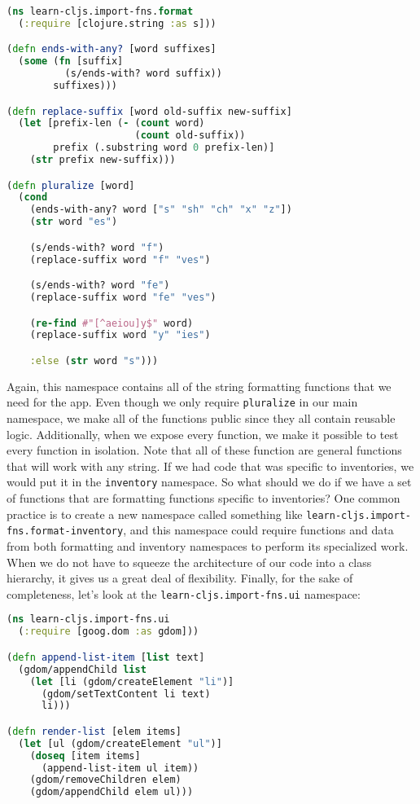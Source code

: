 \documentclass[10pt,twoside,openright]{memoir}
\begin{document}
\begin{lstlisting}[language=Clojure, caption={learn\_cljs/import\_fns/format.cljs}]
(ns learn-cljs.import-fns.format
  (:require [clojure.string :as s]))

(defn ends-with-any? [word suffixes]
  (some (fn [suffix]
          (s/ends-with? word suffix))
        suffixes)))

(defn replace-suffix [word old-suffix new-suffix]
  (let [prefix-len (- (count word)
                      (count old-suffix))
        prefix (.substring word 0 prefix-len)]
    (str prefix new-suffix)))

(defn pluralize [word]
  (cond
    (ends-with-any? word ["s" "sh" "ch" "x" "z"])
    (str word "es")

    (s/ends-with? word "f")
    (replace-suffix word "f" "ves")

    (s/ends-with? word "fe")
    (replace-suffix word "fe" "ves")

    (re-find #"[^aeiou]y$" word)
    (replace-suffix word "y" "ies")

    :else (str word "s")))
\end{lstlisting}

Again, this namespace contains all of the string formatting functions
that we need for the app. Even though we only require \texttt{pluralize}
in our main namespace, we make all of the functions public since they
all contain reusable logic. Additionally, when we expose every function,
we make it possible to test every function in isolation. Note that all
of these function are general functions that will work with any string.
If we had code that was specific to inventories, we would put it in the
\texttt{inventory} namespace. So what should we do if we have a set of
functions that are formatting functions specific to inventories? One
common practice is to create a new namespace called something like
\texttt{learn-cljs.import-fns.format-inventory}, and this namespace
could require functions and data from both formatting and inventory
namespaces to perform its specialized work. When we do not have to
squeeze the architecture of our code into a class hierarchy, it gives us
a great deal of flexibility. Finally, for the sake of completeness,
let's look at the \texttt{learn-cljs.import-fns.ui} namespace:

\begin{lstlisting}[language=Clojure, caption={learn\_cljs/import\_fns/ui.cljs}]
(ns learn-cljs.import-fns.ui
  (:require [goog.dom :as gdom]))

(defn append-list-item [list text]
  (gdom/appendChild list
    (let [li (gdom/createElement "li")]
      (gdom/setTextContent li text)
      li)))

(defn render-list [elem items]
  (let [ul (gdom/createElement "ul")]
    (doseq [item items]
      (append-list-item ul item))
    (gdom/removeChildren elem)
    (gdom/appendChild elem ul)))
\end{lstlisting}
\end{document}

